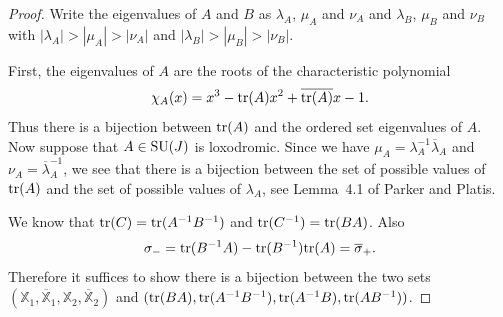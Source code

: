 \documentclass[11pt]{amsart}
\numberwithin{equation}{section}
\begin{document}
\begin{proof}
Write the eigenvalues of $A$ and $B$ as 
$\lambda_A$, $\mu_A$ and $\nu_A$ and $\lambda_B$, $\mu_B$ and $\nu_B$ with $|\lambda_A|>|\mu_A|>|\nu_A|$ and 
$|\lambda_B|>|\mu_B|>|\nu_B|$. 

First, the eigenvalues of $A$ are the roots of the characteristic polynomial 
$$
\chi_A(x)=x^3-{\rm tr}(A)x^2+\overline{{\rm tr}(A)}x-1.
$$
Thus there is a bijection between ${\rm tr}(A)$ and the ordered set eigenvalues of $A$. 
Now suppose that $A\in{\rm SU}(J)$ is loxodromic. Since we have
$\mu_A=\lambda_A^{-1}\overline{\lambda}_A$ and $\nu_A=\overline{\lambda}_A^{-1}$, we see that there
is a bijection between the set of possible values of ${\rm tr}(A)$ and the set of possible values of 
$\lambda_A$, see Lemma~4.1 of Parker and Platis.

We know that ${\rm tr}(C)={\rm tr}(A^{-1}B^{-1})$ and ${\rm tr}(C^{-1})={\rm tr}(BA)$. Also
$$
\sigma_-={\rm tr}(B^{-1}A)-{\rm tr}(B^{-1}){\rm tr}(A)=\overline{\sigma}_+.
$$ 
Therefore it suffices to show there
is a bijection between the two sets 
$({\mathbb X}_1,\overline{\mathbb X}_1,{\mathbb X}_2,\overline{\mathbb X}_2)$ and
$({\rm tr}(BA),{\rm tr}(A^{-1}B^{-1}),{\rm tr}(A^{-1}B),{\rm tr}(AB^{-1}))$. 
 

\end{proof}
\end{document}
